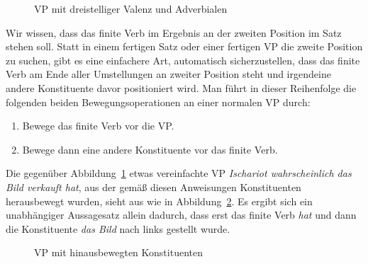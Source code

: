 \begin{figure}[!htbp]
  \caption{VP mit dreistelliger Valenz und Adverbialen}
  \label{fig:vgreinstelligwh}
\end{figure}

Wir wissen, dass das finite Verb im Ergebnis an der zweiten Position im Satz stehen soll.
Statt in einem fertigen Satz oder einer fertigen VP die zweite Position zu suchen, gibt es eine einfachere Art, automatisch sicherzustellen, dass das finite Verb am Ende aller Umstellungen an zweiter Position steht und irgendeine andere Konstituente davor positioniert wird.
Man führt in dieser Reihenfolge die folgenden beiden Bewegungsoperationen an einer normalen VP durch:


\begin{enumerate}\Lf
  \item Bewege das finite Verb vor die VP.
  \item Bewege dann eine andere Konstituente vor das finite Verb.
\end{enumerate}

Die gegenüber Abbildung~\ref{fig:vgreinstelligwh} etwas vereinfachte VP \textit{Ischariot wahrscheinlich das Bild verkauft hat}, aus der gemäß diesen Anweisungen Konstituenten herausbewegt wurden, sieht aus wie in Abbildung~\ref{fig:movev2}.
Es ergibt sich ein unabhängiger Aussagesatz allein dadurch, dass erst das finite Verb \textit{hat} und dann die Konstituente \textit{das Bild} nach links gestellt wurde.

\begin{figure}[!htbp]
  \caption{VP mit hinausbewegten Konstituenten}
  \label{fig:movev2}
\end{figure}

